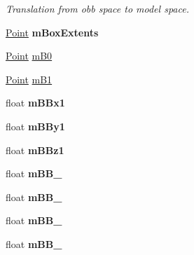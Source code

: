 \begin{DoxyCompactItemize}
\begin{DoxyCompactList}\small\item\em Translation from obb space to model space. \end{DoxyCompactList}\item 
\hyperlink{classOpcode_1_1Point}{Point} {\bfseries m\+Box\+Extents}\hypertarget{classOpcode_1_1OBBCollider_a457667ebe9fa3c0923f87992ff7ad6bb}{}\label{classOpcode_1_1OBBCollider_a457667ebe9fa3c0923f87992ff7ad6bb}

\item 
\hyperlink{classOpcode_1_1Point}{Point} \hyperlink{classOpcode_1_1OBBCollider_a819dfe4b93e6acee305b4d84d7f5578e}{m\+B0}
\item 
\hyperlink{classOpcode_1_1Point}{Point} \hyperlink{classOpcode_1_1OBBCollider_a8b60cb6292a537c73d09076321755bee}{m\+B1}
\item 
float {\bfseries m\+B\+Bx1}\hypertarget{classOpcode_1_1OBBCollider_a30790f2b04a997a60288e71872eb7f84}{}\label{classOpcode_1_1OBBCollider_a30790f2b04a997a60288e71872eb7f84}

\item 
float {\bfseries m\+B\+By1}\hypertarget{classOpcode_1_1OBBCollider_a0d5d8259e85b86da8ddcde729a77eda7}{}\label{classOpcode_1_1OBBCollider_a0d5d8259e85b86da8ddcde729a77eda7}

\item 
float {\bfseries m\+B\+Bz1}\hypertarget{classOpcode_1_1OBBCollider_a8f797c2238c56e5dc64662fe34d45aa8}{}\label{classOpcode_1_1OBBCollider_a8f797c2238c56e5dc64662fe34d45aa8}

\item 
float {\bfseries m\+B\+B\+\_}\hypertarget{classOpcode_1_1OBBCollider_a513d2b0552f3f56f53f5c22d3472bd0b}{}\label{classOpcode_1_1OBBCollider_a513d2b0552f3f56f53f5c22d3472bd0b}

\item 
float {\bfseries m\+B\+B\+\_}\hypertarget{classOpcode_1_1OBBCollider_a86436d7f2d1a390fef62225a0198db60}{}\label{classOpcode_1_1OBBCollider_a86436d7f2d1a390fef62225a0198db60}

\item 
float {\bfseries m\+B\+B\+\_}\hypertarget{classOpcode_1_1OBBCollider_adb900a4aabd7876dbb772a9fdf39f29c}{}\label{classOpcode_1_1OBBCollider_adb900a4aabd7876dbb772a9fdf39f29c}

\item 
float {\bfseries m\+B\+B\+\_}\hypertarget{classOpcode_1_1OBBCollider_a7acdb9f797faaff124189007a0e1a6c9}{}\label{classOpcode_1_1OBBCollider_a7acdb9f797faaff124189007a0e1a6c9}


\end{DoxyCompactItemize}
